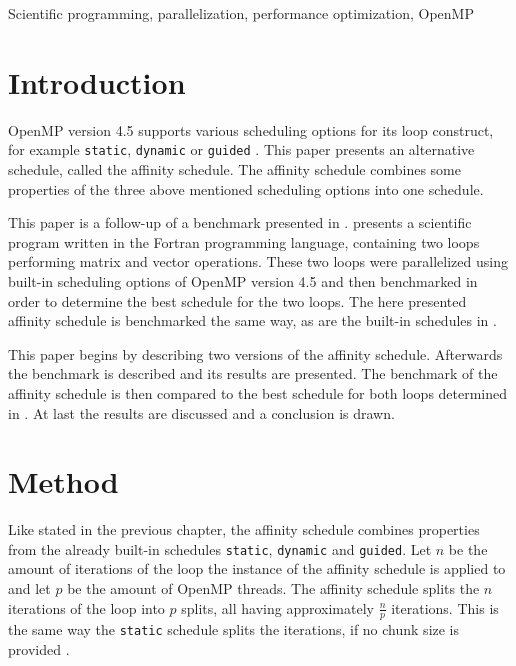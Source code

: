 \documentclass[twoside,11pt]{article}
\title{\titl}
\author{}
\begin{document}
\maketitle

\begin{abstract}
\end{abstract}

\begin{keywords}
Scientific programming, parallelization,
performance optimization, OpenMP
\end{keywords}

\section{Introduction} %

OpenMP version 4.5 supports various scheduling options for
its loop construct, for example \texttt{static},
\texttt{dynamic} or \texttt{guided}
\citep[see][Chapter 2]{omp}.
This paper presents an alternative schedule, called the
affinity schedule.
The affinity schedule combines some properties of the three
above mentioned scheduling options into one schedule.

This paper is a follow-up of a benchmark presented in
\citet{b1}.
\citet{b1} presents a scientific program written in the
Fortran programming language, containing two loops
performing matrix and vector operations.
These two loops were parallelized using built-in scheduling
options of OpenMP version 4.5 and then benchmarked in order
to determine the best schedule for the two loops.
The here presented affinity schedule is benchmarked the
same way, as are the built-in schedules in \citet{b1}.

This paper begins by describing two versions of the
affinity schedule. Afterwards the benchmark is described
and its results are presented. The benchmark of the
affinity schedule is then compared to the best schedule for
both loops determined in \citet{b1}.
At last the results are discussed and a conclusion is
drawn.


\section{Method} %

Like stated in the previous chapter, the affinity schedule
combines properties from the already built-in schedules
\texttt{static}, \texttt{dynamic} and \texttt{guided}.
Let $n$ be the amount of iterations of the loop the
instance of the affinity schedule is applied to and let $p$
be the amount of OpenMP threads.
The affinity schedule splits the $n$ iterations of the
loop into $p$ splits, all having approximately
$\frac{n}{p}$ iterations.
This is the same way the \texttt{static} schedule splits
the iterations, if no chunk size is provided
\citep[see][Chapter 2]{omp}.
\end{document}

